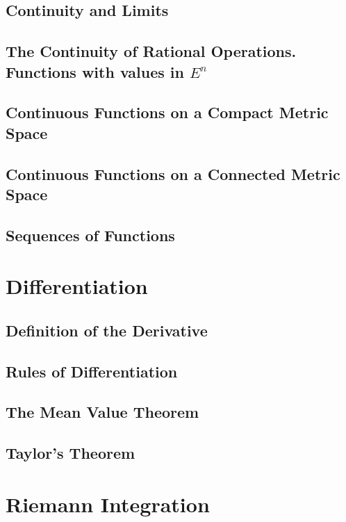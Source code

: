 \documentclass{article}
\begin{document}
		\subsection{Continuity and Limits}
		
		\subsection{The Continuity of Rational Operations. Functions with values in $E^n$}
		
		\subsection{Continuous Functions on a Compact Metric Space}
		
		\subsection{Continuous Functions on a Connected Metric Space}
		
		\subsection{Sequences of Functions}
	
	\section{Differentiation}
		\subsection{Definition of the Derivative}
		
		\subsection{Rules of Differentiation}		
		
		\subsection{The Mean Value Theorem}
		
		\subsection{Taylor's Theorem}	
	
	\section{Riemann Integration}
\end{document}
